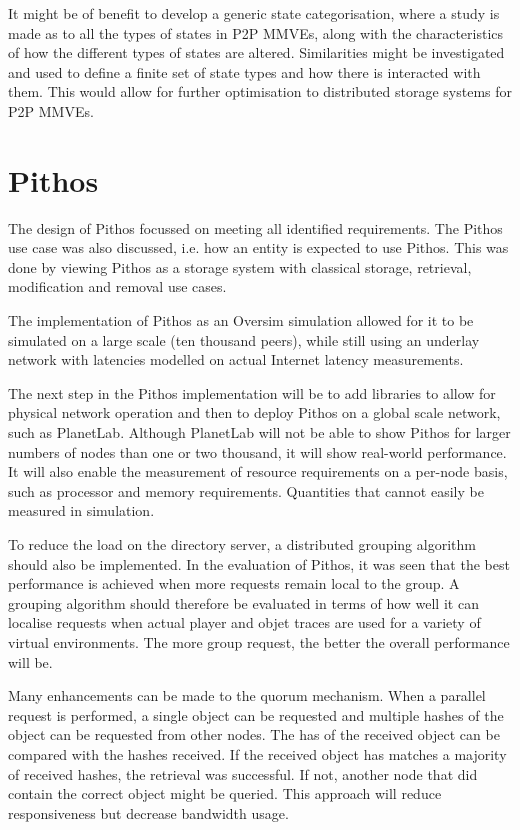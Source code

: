 It might be of benefit to develop a generic state categorisation, where a study is made as to all the types of states in P2P MMVEs, along with the characteristics of how the different types of states are altered. Similarities might be investigated and used to define a finite set of state types and how there is interacted with them. This would allow for further optimisation to distributed storage systems for P2P MMVEs.

\section{Pithos}

The design of Pithos focussed on meeting all identified requirements. The Pithos use case was also discussed, i.e. how an entity is expected to use Pithos. This was done by viewing Pithos as a storage system with classical storage, retrieval, modification and removal use cases.

The implementation of Pithos as an Oversim simulation allowed for it to be simulated on a large scale (ten thousand peers), while still using an underlay network with latencies modelled on actual Internet latency measurements.

The next step in the Pithos implementation will be to add libraries to allow for physical network operation and then to deploy Pithos on a global scale network, such as PlanetLab. Although PlanetLab will not be able to show Pithos for larger numbers of nodes than one or two thousand, it will show real-world performance.  It will also enable the measurement of resource requirements on a per-node basis, such as processor and memory requirements. Quantities that cannot easily be measured in simulation.

To reduce the load on the directory server, a distributed grouping algorithm should also be implemented. In the evaluation of Pithos, it was seen that the best performance is achieved when more requests remain local to the group. A grouping algorithm should therefore be evaluated in terms of how well it can localise requests when actual player and objet traces are used for a variety of virtual environments. The more group request, the better the overall performance will be.

Many enhancements can be made to the quorum mechanism. When a parallel request is performed, a single object can be requested and multiple hashes of the object can be requested from other nodes. The has of the received object can be compared with the hashes received. If the received object has matches a majority of received hashes, the retrieval was successful. If not, another node that did contain the correct object might be queried. This approach will reduce responsiveness but decrease bandwidth usage. 

